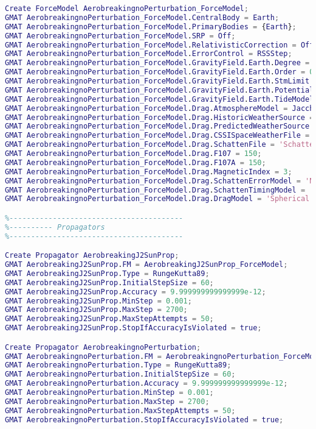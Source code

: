 \begin{lstlisting}[language=MATLAB, caption= Scrit de GMAT]
Create ForceModel AerobreakingnoPerturbation_ForceModel;
GMAT AerobreakingnoPerturbation_ForceModel.CentralBody = Earth;
GMAT AerobreakingnoPerturbation_ForceModel.PrimaryBodies = {Earth};
GMAT AerobreakingnoPerturbation_ForceModel.SRP = Off;
GMAT AerobreakingnoPerturbation_ForceModel.RelativisticCorrection = Off;
GMAT AerobreakingnoPerturbation_ForceModel.ErrorControl = RSSStep;
GMAT AerobreakingnoPerturbation_ForceModel.GravityField.Earth.Degree = 1;
GMAT AerobreakingnoPerturbation_ForceModel.GravityField.Earth.Order = 0;
GMAT AerobreakingnoPerturbation_ForceModel.GravityField.Earth.StmLimit = 100;
GMAT AerobreakingnoPerturbation_ForceModel.GravityField.Earth.PotentialFile = 'JGM2.cof';
GMAT AerobreakingnoPerturbation_ForceModel.GravityField.Earth.TideModel = 'None';
GMAT AerobreakingnoPerturbation_ForceModel.Drag.AtmosphereModel = JacchiaRoberts;
GMAT AerobreakingnoPerturbation_ForceModel.Drag.HistoricWeatherSource = 'ConstantFluxAndGeoMag';
GMAT AerobreakingnoPerturbation_ForceModel.Drag.PredictedWeatherSource = 'ConstantFluxAndGeoMag';
GMAT AerobreakingnoPerturbation_ForceModel.Drag.CSSISpaceWeatherFile = 'SpaceWeather-All-v1.2.txt';
GMAT AerobreakingnoPerturbation_ForceModel.Drag.SchattenFile = 'SchattenPredict.txt';
GMAT AerobreakingnoPerturbation_ForceModel.Drag.F107 = 150;
GMAT AerobreakingnoPerturbation_ForceModel.Drag.F107A = 150;
GMAT AerobreakingnoPerturbation_ForceModel.Drag.MagneticIndex = 3;
GMAT AerobreakingnoPerturbation_ForceModel.Drag.SchattenErrorModel = 'Nominal';
GMAT AerobreakingnoPerturbation_ForceModel.Drag.SchattenTimingModel = 'NominalCycle';
GMAT AerobreakingnoPerturbation_ForceModel.Drag.DragModel = 'Spherical';

%----------------------------------------
%---------- Propagators
%----------------------------------------

Create Propagator AerobreakingJ2SunProp;
GMAT AerobreakingJ2SunProp.FM = AerobreakingJ2SunProp_ForceModel;
GMAT AerobreakingJ2SunProp.Type = RungeKutta89;
GMAT AerobreakingJ2SunProp.InitialStepSize = 60;
GMAT AerobreakingJ2SunProp.Accuracy = 9.999999999999999e-12;
GMAT AerobreakingJ2SunProp.MinStep = 0.001;
GMAT AerobreakingJ2SunProp.MaxStep = 2700;
GMAT AerobreakingJ2SunProp.MaxStepAttempts = 50;
GMAT AerobreakingJ2SunProp.StopIfAccuracyIsViolated = true;

Create Propagator AerobreakingnoPerturbation;
GMAT AerobreakingnoPerturbation.FM = AerobreakingnoPerturbation_ForceModel;
GMAT AerobreakingnoPerturbation.Type = RungeKutta89;
GMAT AerobreakingnoPerturbation.InitialStepSize = 60;
GMAT AerobreakingnoPerturbation.Accuracy = 9.999999999999999e-12;
GMAT AerobreakingnoPerturbation.MinStep = 0.001;
GMAT AerobreakingnoPerturbation.MaxStep = 2700;
GMAT AerobreakingnoPerturbation.MaxStepAttempts = 50;
GMAT AerobreakingnoPerturbation.StopIfAccuracyIsViolated = true;


\end{lstlisting}
